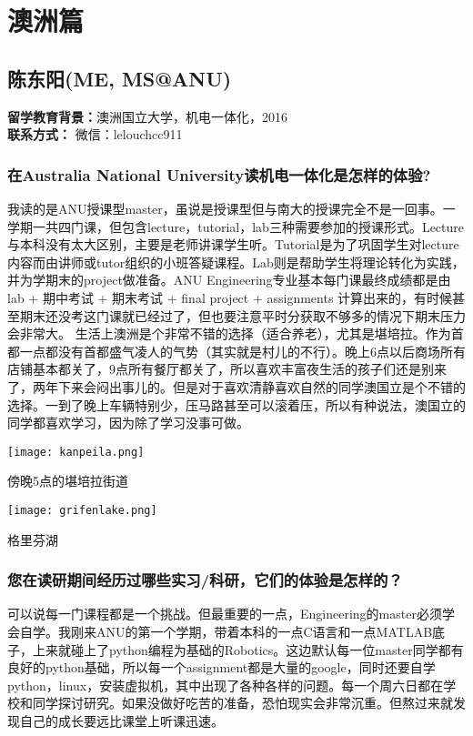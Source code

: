 \documentclass[a4paper,UTF8]{book}
\begin{document}
\clearpage
\section{澳洲篇}

\subsection{陈东阳(ME, MS@ANU)}
    \textbf{留学教育背景：}澳洲国立大学，机电一体化，2016\\
    \textbf{联系方式：} 微信：lelouchcc911

    \subsubsection*{在Australia National University读机电一体化是怎样的体验?}
    我读的是ANU授课型master，虽说是授课型但与南大的授课完全不是一回事。一学期一共四门课，但包含lecture，tutorial，lab三种需要参加的授课形式。Lecture与本科没有太大区别，主要是老师讲课学生听。Tutorial是为了巩固学生对lecture内容而由讲师或tutor组织的小班答疑课程。Lab则是帮助学生将理论转化为实践，并为学期末的project做准备。ANU Engineering专业基本每门课最终成绩都是由lab + 期中考试 + 期末考试 + final project + assignments 计算出来的，有时候甚至期末还没考这门课就已经过了，但也要注意平时分获取不够多的情况下期末压力会非常大。
    生活上澳洲是个非常不错的选择（适合养老），尤其是堪培拉。作为首都一点都没有首都盛气凌人的气势（其实就是村儿的不行）。晚上6点以后商场所有店铺基本都关了，9点所有餐厅都关了，所以喜欢丰富夜生活的孩子们还是别来了，两年下来会闷出事儿的。但是对于喜欢清静喜欢自然的同学澳国立是个不错的选择。一到了晚上车辆特别少，压马路甚至可以滚着压，所以有种说法，澳国立的同学都喜欢学习，因为除了学习没事可做。 
    \vspace{3ex}

    \centerline{\texttt{[image: kanpeila.png]}}
    \centerline{傍晚5点的堪培拉街道}
    \centerline{\texttt{[image: grifenlake.png]}}
    \centerline{格里芬湖}
    \subsubsection*{您在读研期间经历过哪些实习/科研，它们的体验是怎样的？}
    可以说每一门课程都是一个挑战。但最重要的一点，Engineering的master必须学会自学。我刚来ANU的第一个学期，带着本科的一点C语言和一点MATLAB底子，上来就碰上了python编程为基础的Robotics。这边默认每一位master同学都有良好的python基础，所以每一个assignment都是大量的google，同时还要自学python，linux，安装虚拟机，其中出现了各种各样的问题。每一个周六日都在学校和同学探讨研究。如果没做好吃苦的准备，恐怕现实会非常沉重。但熬过来就发现自己的成长要远比课堂上听课迅速。
\end{document}
